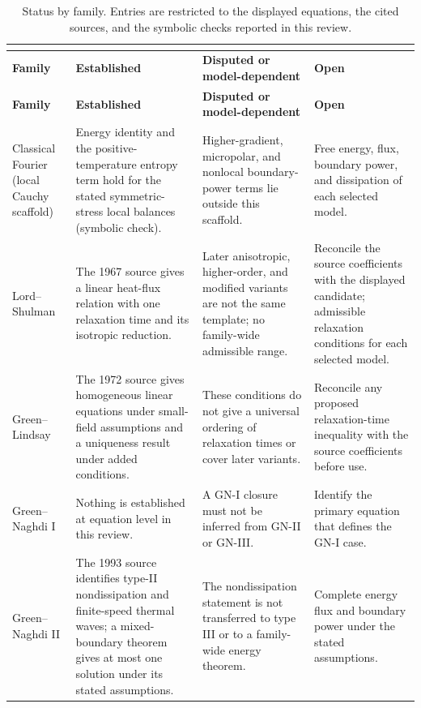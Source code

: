 \begin{longtable}{@{}>{\raggedright\arraybackslash}p{2.6cm}>{\raggedright\arraybackslash}p{3.9cm}>{\raggedright\arraybackslash}p{3.9cm}>{\raggedright\arraybackslash}p{3.9cm}@{}}
\caption{Status by family. Entries are restricted to the displayed equations, the cited sources, and the symbolic checks reported in this review.}\\
\label{tab:status_by_family}\\
\toprule
\textbf{Family} & \textbf{Established} & \textbf{Disputed or model-dependent} & \textbf{Open} \\
\midrule
\endfirsthead
\toprule
\textbf{Family} & \textbf{Established} & \textbf{Disputed or model-dependent} & \textbf{Open} \\
\midrule
\endhead
\bottomrule
\endfoot
Classical Fourier (local Cauchy scaffold) & Energy identity and the positive-temperature entropy term hold for the stated symmetric-stress local balances (symbolic check). & Higher-gradient, micropolar, and nonlocal boundary-power terms lie outside this scaffold. & Free energy, flux, boundary power, and dissipation of each selected model. \\
Lord--Shulman & The 1967 source gives a linear heat-flux relation with one relaxation time and its isotropic reduction. & Later anisotropic, higher-order, and modified variants are not the same template; no family-wide admissible range. & Reconcile the source coefficients with the displayed candidate; admissible relaxation conditions for each selected model. \\
Green--Lindsay & The 1972 source gives homogeneous linear equations under small-field assumptions and a uniqueness result under added conditions. & These conditions do not give a universal ordering of relaxation times or cover later variants. & Reconcile any proposed relaxation-time inequality with the source coefficients before use. \\
Green--Naghdi I & Nothing is established at equation level in this review. & A GN-I closure must not be inferred from GN-II or GN-III. & Identify the primary equation that defines the GN-I case. \\
Green--Naghdi II & The 1993 source identifies type-II nondissipation and finite-speed thermal waves; a mixed-boundary theorem gives at most one solution under its stated assumptions. & The nondissipation statement is not transferred to type III or to a family-wide energy theorem. & Complete energy flux and boundary power under the stated assumptions. \\

\end{longtable}
